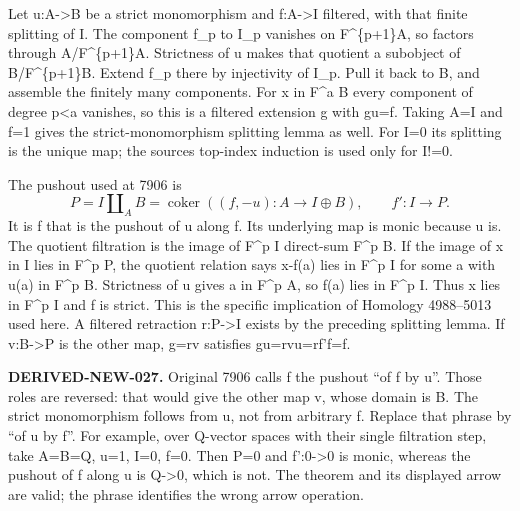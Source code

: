 \documentclass[11pt]{article}
\begin{document}
Let u:\allowbreak{}A\allowbreak{}->B be a strict monomorphism and f:\allowbreak{}A\allowbreak{}->I filtered,\allowbreak{} with that finite splitting of I. The component f\_\allowbreak{}p to I\_\allowbreak{}p vanishes on F\textasciicircum{}\{p\allowbreak{}+1\}A,\allowbreak{} so factors through A/\allowbreak{}F\textasciicircum{}\{p\allowbreak{}+1\}A. Strictness of u makes that quotient a subobject of B/\allowbreak{}F\textasciicircum{}\{p\allowbreak{}+1\}B. Extend f\_\allowbreak{}p there by injectivity of I\_\allowbreak{}p. Pull it back to B,\allowbreak{} and assemble the finitely many components. For x in F\^{}a B every component of degree p\textless a vanishes,\allowbreak{} so this is a filtered extension g with gu\allowbreak{}=f. Taking A\allowbreak{}=I and f\allowbreak{}=1 gives the strict-monomorphism splitting lemma as well. For I\allowbreak{}=0 its splitting is the unique map; the source\textquotesingle s top-index induction is used only for I!\allowbreak{}=0.

The pushout used at 7906 is \[
 P=I\amalg_A B
   =\operatorname{coker}((f,-u):A\to I\oplus B),\qquad
 f':I\longrightarrow P.                                      \tag{3.1}
\] It is f\textquotesingle{} that is the pushout of u along f. Its underlying map is monic because u is. The quotient filtration is the image of F\^{}p I direct-sum F\^{}p B. If the image of x in I lies in F\^{}p P,\allowbreak{} the quotient relation says x-f(a)\allowbreak{} lies in F\^{}p I for some a with u(a)\allowbreak{} in F\^{}p B. Strictness of u gives a in F\^{}p A,\allowbreak{} so f(a)\allowbreak{} lies in F\^{}p I. Thus x lies in F\^{}p I and f\textquotesingle{} is strict. This is the specific implication of Homology 4988–\allowbreak{}5013 used here. A filtered retraction r:\allowbreak{}P\allowbreak{}->I exists by the preceding splitting lemma. If v:\allowbreak{}B\allowbreak{}->P is the other map,\allowbreak{} g\allowbreak{}=rv satisfies gu\allowbreak{}=rvu\allowbreak{}=rf'f\allowbreak{}=f.

\textbf{DERIVED-NEW-027.} Original 7906 calls f\textquotesingle{} the pushout ``of f by u''. Those roles are reversed:\allowbreak{} that would give the other map v,\allowbreak{} whose domain is B. The strict monomorphism follows from u,\allowbreak{} not from arbitrary f. Replace that phrase by ``of u by f''. For example,\allowbreak{} over Q-vector spaces with their single filtration step,\allowbreak{} take A\allowbreak{}=B\allowbreak{}=Q,\allowbreak{} u\allowbreak{}=1,\allowbreak{} I\allowbreak{}=0,\allowbreak{} f\allowbreak{}=0. Then P\allowbreak{}=0 and f':\allowbreak{}0\allowbreak{}->0 is monic,\allowbreak{} whereas the pushout of f along u is Q\allowbreak{}->0,\allowbreak{} which is not. The theorem and its displayed arrow are valid; the phrase identifies the wrong arrow operation.
\end{document}

